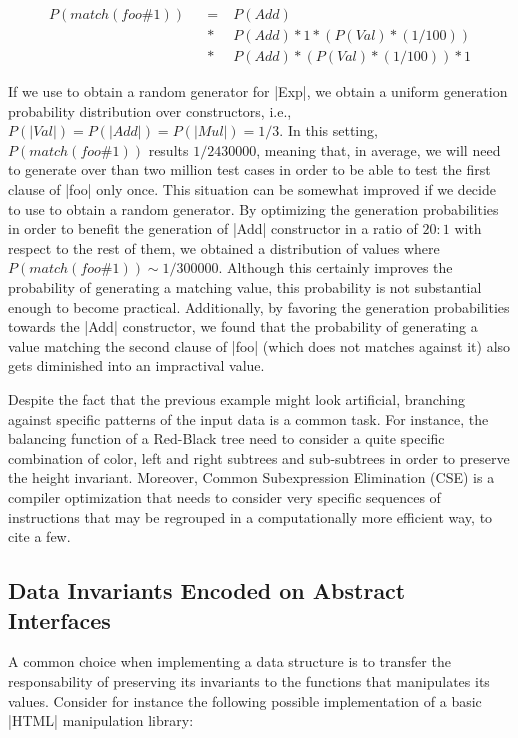 \begin{align*}
  P(match(foo\#1))
  \!&&=\; &P(Add) \\
  \!&&*\; &P(Add) * 1 * (P(Val) * (1/100)) \\
  \!&&*\; &P(Add) * (P(Val) * (1/100)) * 1
\end{align*}

If we use \megadeth to obtain a random generator for |Exp|, we obtain a uniform
generation probability distribution over constructors, i.e., $P(|Val|) =
P(|Add|) = P(|Mul|) = 1/3$.
%
In this setting, $P(match(foo\#1))$ results $1/2430000$, meaning that, in
average, we will need to generate over than two million test cases in order to
be able to test the first clause of |foo| only once.
%
This situation can be somewhat improved if we decide to use \dragen to obtain a
random generator.
%
By optimizing the generation probabilities in order to benefit the generation of
|Add| constructor in a ratio of $20:1$ with respect to the rest of them, we
obtained a distribution of values where $P(match(foo\#1)) \sim 1/300000$.
%
Although this certainly improves the probability of generating a matching value,
this probability is not substantial enough to become practical.
%
Additionally, by favoring the generation probabilities towards the |Add|
constructor, we found that the probability of generating a value matching the
second clause of |foo| (which does not matches against it) also gets diminished
into an impractival value.


Despite the fact that the previous example might look artificial, branching
against specific patterns of the input data is a common task.
%
For instance, the balancing function of a Red-Black tree need to consider a
quite specific combination of color, left and right subtrees and sub-subtrees
in order to preserve the height invariant.
%
Moreover, Common Subexpression Elimination (CSE) is a compiler optimization that
needs to consider very specific sequences of instructions that may be regrouped
in a computationally more efficient way, to cite a few.



\subsection{\textbf{Data Invariants Encoded on Abstract Interfaces}}

A common choice when implementing a data structure is to transfer the
responsability of preserving its invariants to the functions that manipulates
its values.
%
Consider for instance the following possible implementation of a basic |HTML|
manipulation library:

